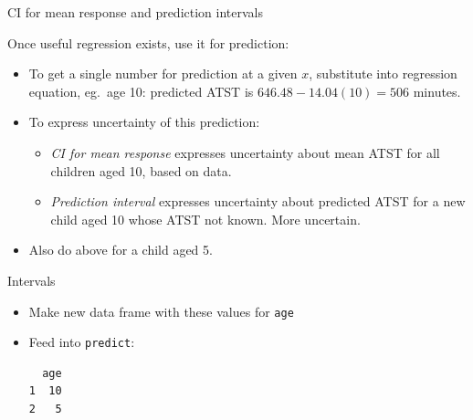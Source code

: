 % 
% 
% 


\begin{frame}{CI for mean response and prediction intervals}

Once useful regression exists, use it for prediction:


\begin{itemize}
\item To get a single number for prediction at a given $x$, substitute into regression equation, eg.\ age 10: predicted ATST is $646.48-14.04(10)=506$ minutes.
\item To express uncertainty of this prediction:
  \begin{itemize}
  \item {\em CI for mean response} expresses uncertainty about mean ATST for all children aged 10, based on data.
  \item {\em Prediction interval} expresses uncertainty about predicted ATST for a new child aged 10 whose ATST not known. More uncertain.
  \end{itemize}
\item Also do above for a child aged 5.
\end{itemize}
\end{frame}

\begin{frame}[fragile]{Intervals}
\begin{itemize}
\item Make new data frame with these values for \texttt{age}
\item Feed into \texttt{predict}:
  
{\small  
 
\begin{knitrout}
\color{fgcolor}\begin{kframe}
\begin{alltt}
\hlkwb{=}\hlstd{(}\hlstd{,}\hlstd{)}
\hlkwb{=}\hlstd{(}
\end{alltt}
\begin{verbatim}
  age
1  10
2   5
\end{verbatim}
\begin{alltt}
\hlkwb{=}\hlstd{=}\hlstd{)}
\hlkwb{=}\hlstd{=}\hlstd{)}
\end{alltt}
\end{kframe}
\end{knitrout}
}

  
\end{itemize}

\end{frame}

